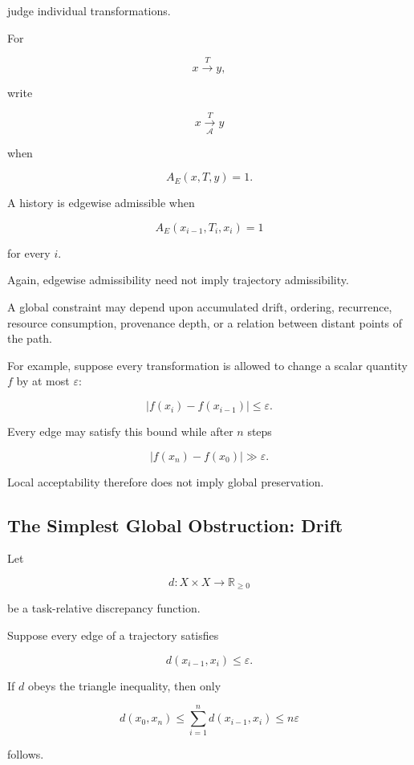 \documentclass[
  11pt,
  a4paper,
  DIV=12,
  BCOR=0mm,
  parskip=half-
]{scrartcl}
\theoremstyle{definition}
\theoremstyle{plain}
\theoremstyle{remark}
\begin{document}
judge individual transformations.

For

\[
  x\xrightarrow{T}y,
\]

write

\[
  x\xrightarrow[\mathcal A]{T}y
\]

when

\[
  A_E(x,T,y)=1.
\]

A history is edgewise admissible when

\[
  A_E(x_{i-1},T_i,x_i)=1
\]

for every \(i\).

Again, edgewise admissibility need not imply trajectory admissibility.

A global constraint may depend upon accumulated drift, ordering, recurrence,
resource consumption, provenance depth, or a relation between distant points
of the path.

For example, suppose every transformation is allowed to change a scalar
quantity \(f\) by at most \(\varepsilon\):

\[
  |f(x_i)-f(x_{i-1})|
  \leq
  \varepsilon.
\]

Every edge may satisfy this bound while after \(n\) steps

\[
  |f(x_n)-f(x_0)|
  \gg
  \varepsilon.
\]

Local acceptability therefore does not imply global preservation.


\subsection{The Simplest Global Obstruction: Drift}
\label{app:drift}

Let

\[
  d:X\times X\to\mathbb R_{\geq 0}
\]

be a task-relative discrepancy function.

Suppose every edge of a trajectory satisfies

\[
  d(x_{i-1},x_i)\leq\varepsilon.
\]

If \(d\) obeys the triangle inequality, then only

\[
  d(x_0,x_n)
  \leq
  \sum_{i=1}^{n}d(x_{i-1},x_i)
  \leq
  n\varepsilon
\]

follows.
\end{document}
